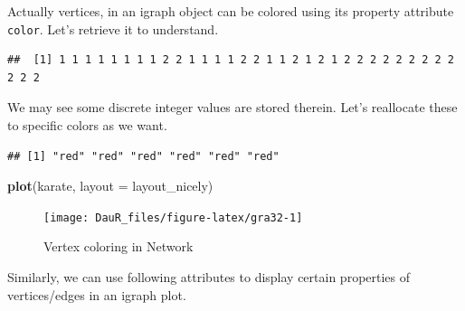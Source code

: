 \documentclass[
]{book}
\newenvironment{Shaded}{\begin{snugshade}}{\end{snugshade}}
\newcommand{\AttributeTok}[1]{\textcolor[rgb]{0.13,0.29,0.53}{#1}}
\newcommand{\FunctionTok}[1]{\textcolor[rgb]{0.13,0.29,0.53}{\textbf{#1}}}
\newcommand{\NormalTok}[1]{#1}
\newcommand{\OtherTok}[1]{\textcolor[rgb]{0.56,0.35,0.01}{#1}}
\newcommand{\SpecialCharTok}[1]{\textcolor[rgb]{0.81,0.36,0.00}{\textbf{#1}}}
\newcommand{\StringTok}[1]{\textcolor[rgb]{0.31,0.60,0.02}{#1}}
\begin{document}
Actually vertices, in an igraph object can be colored using its property attribute \texttt{color}. Let's retrieve it to understand.

\begin{Shaded}
\end{Shaded}

\begin{verbatim}
##  [1] 1 1 1 1 1 1 1 1 2 2 1 1 1 1 2 2 1 1 2 1 2 1 2 2 2 2 2 2 2 2 2 2 2 2
\end{verbatim}

We may see some discrete integer values are stored therein. Let's reallocate these to specific colors as we want.

\begin{Shaded}
\end{Shaded}

\begin{verbatim}
## [1] "red" "red" "red" "red" "red" "red"
\end{verbatim}

\begin{Shaded}
\begin{Highlighting}[]
\FunctionTok{plot}\NormalTok{(karate, }\AttributeTok{layout =}\NormalTok{ layout\_nicely)}
\end{Highlighting}
\end{Shaded}

\begin{figure}

{\centering \texttt{[image: DauR\_files/figure-latex/gra32-1]} 

}

\caption{Vertex coloring in Network}\label{fig:gra32}
\end{figure}

Similarly, we can use following attributes to display certain properties of vertices/edges in an igraph plot.
\end{document}
